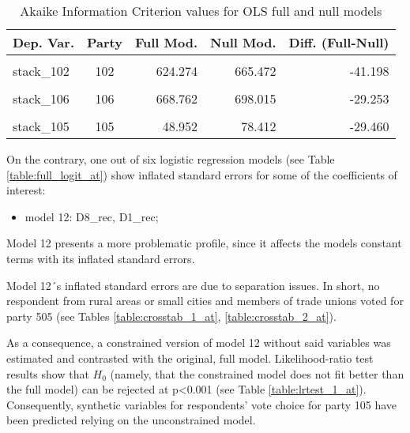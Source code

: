 \documentclass[
]{article}
\providecommand{\tightlist}{%
  \setlength{\itemsep}{0pt}\setlength{\parskip}{0pt}}
\begin{document}
\begin{table}[!h]

\caption{\label{tab:unnamed-chunk-4}Akaike Information Criterion values for OLS full and null models 
        \label{table:ols_aic_at}}
\centering
\begin{tabular}[t]{lcrrr}
\toprule
Dep. Var. & Party & Full Mod. & Null Mod. & Diff. (Full-Null)\\
\midrule
\cellcolor{gray!6}{stack\_101} & \cellcolor{gray!6}{101} & \cellcolor{gray!6}{682.375} & \cellcolor{gray!6}{720.163} & \cellcolor{gray!6}{-37.787}\\
stack\_102 & 102 & 624.274 & 665.472 & -41.198\\
\cellcolor{gray!6}{stack\_104} & \cellcolor{gray!6}{104} & \cellcolor{gray!6}{421.355} & \cellcolor{gray!6}{462.888} & \cellcolor{gray!6}{-41.533}\\
stack\_106 & 106 & 668.762 & 698.015 & -29.253\\
\cellcolor{gray!6}{stack\_103} & \cellcolor{gray!6}{103} & \cellcolor{gray!6}{782.815} & \cellcolor{gray!6}{810.946} & \cellcolor{gray!6}{-28.131}\\
\addlinespace
stack\_105 & 105 & 48.952 & 78.412 & -29.460\\
\bottomrule
\end{tabular}
\end{table}

On the contrary, one out of six logistic regression models (see Table \ref{table:full_logit_at}) show
inflated standard errors for some of the coefficients of interest:

\begin{itemize}
\tightlist
\item
  model 12: D8\_rec, D1\_rec;
\end{itemize}

Model 12 presents a more problematic profile, since it affects the models constant terms with its inflated standard errors.

Model 12´s inflated standard errors are due to separation issues. In short, no respondent from rural areas or small cities and members of trade unions voted for party 505 (see Tables \ref{table:crosstab_1_at},
\ref{table:crosstab_2_at}).

As a consequence, a constrained version of model 12 without said variables was
estimated and contrasted with the original, full model. Likelihood-ratio test results show
that \(H_0\) (namely, that the constrained model does not fit better than the full model) can be rejected at p\textless0.001
(see Table \ref{table:lrtest_1_at}). Consequently, synthetic variables for respondents' vote choice for
party 105 have been predicted relying on the unconstrained model.
\end{document}
